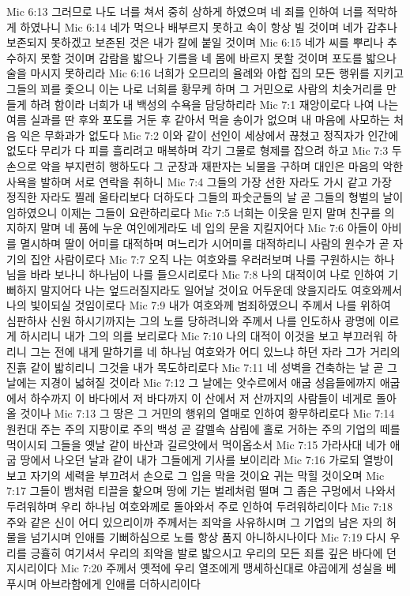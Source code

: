 Mic 6:13  그러므로 나도 너를 쳐서 중히 상하게 하였으며 네 죄를 인하여 너를 적막하게 하였나니
Mic 6:14  네가 먹으나 배부르지 못하고 속이 항상 빌 것이며 네가 감추나 보존되지 못하겠고 보존된 것은 내가 칼에 붙일 것이며
Mic 6:15  네가 씨를 뿌리나 추수하지 못할 것이며 감람을 밟으나 기름을 네 몸에 바르지 못할 것이며 포도를 밟으나 술을 마시지 못하리라
Mic 6:16  너희가 오므리의 율례와 아합 집의 모든 행위를 지키고 그들의 꾀를 좇으니 이는 나로 너희를 황무케 하며 그 거민으로 사람의 치솟거리를 만들게 하려 함이라 너희가 내 백성의 수욕을 담당하리라
Mic 7:1  재앙이로다 나여 나는 여름 실과를 딴 후와 포도를 거둔 후 같아서 먹을 송이가 없으며 내 마음에 사모하는 처음 익은 무화과가 없도다
Mic 7:2  이와 같이 선인이 세상에서 끊쳤고 정직자가 인간에 없도다 무리가 다 피를 흘리려고 매복하며 각기 그물로 형제를 잡으려 하고
Mic 7:3  두 손으로 악을 부지런히 행하도다 그 군장과 재판자는 뇌물을 구하며 대인은 마음의 악한 사욕을 발하며 서로 연락을 취하니
Mic 7:4  그들의 가장 선한 자라도 가시 같고 가장 정직한 자라도 찔레 울타리보다 더하도다 그들의 파숫군들의 날 곧 그들의 형벌의 날이 임하였으니 이제는 그들이 요란하리로다
Mic 7:5  너희는 이웃을 믿지 말며 친구를 의지하지 말며 네 품에 누운 여인에게라도 네 입의 문을 지킬지어다
Mic 7:6  아들이 아비를 멸시하며 딸이 어미를 대적하며 며느리가 시어미를 대적하리니 사람의 원수가 곧 자기의 집안 사람이로다
Mic 7:7  오직 나는 여호와를 우러러보며 나를 구원하시는 하나님을 바라 보나니 하나님이 나를 들으시리로다
Mic 7:8  나의 대적이여 나로 인하여 기뻐하지 말지어다 나는 엎드러질지라도 일어날 것이요 어두운데 앉을지라도 여호와께서 나의 빛이되실 것임이로다
Mic 7:9  내가 여호와께 범죄하였으니 주께서 나를 위하여 심판하사 신원 하시기까지는 그의 노를 당하려니와 주께서 나를 인도하사 광명에 이르게 하시리니 내가 그의 의를 보리로다
Mic 7:10  나의 대적이 이것을 보고 부끄러워 하리니 그는 전에 내게 말하기를 네 하나님 여호와가 어디 있느냐 하던 자라 그가 거리의 진흙 같이 밟히리니 그것을 내가 목도하리로다
Mic 7:11  네 성벽을 건축하는 날 곧 그 날에는 지경이 넓혀질 것이라
Mic 7:12  그 날에는 앗수르에서 애굽 성읍들에까지 애굽에서 하수까지 이 바다에서 저 바다까지 이 산에서 저 산까지의 사람들이 네게로 돌아올 것이나
Mic 7:13  그 땅은 그 거민의 행위의 열매로 인하여 황무하리로다
Mic 7:14  원컨대 주는 주의 지팡이로 주의 백성 곧 갈멜속 삼림에 홀로 거하는 주의 기업의 떼를 먹이시되 그들을 옛날 같이 바산과 길르앗에서 먹이옵소서
Mic 7:15  가라사대 네가 애굽 땅에서 나오던 날과 같이 내가 그들에게 기사를 보이리라
Mic 7:16  가로되 열방이 보고 자기의 세력을 부끄려서 손으로 그 입을 막을 것이요 귀는 막힐 것이오며
Mic 7:17  그들이 뱀처럼 티끌을 핥으며 땅에 기는 벌레처럼 떨며 그 좁은 구멍에서 나와서 두려워하며 우리 하나님 여호와께로 돌아와서 주로 인하여 두려워하리이다
Mic 7:18  주와 같은 신이 어디 있으리이까 주께서는 죄악을 사유하시며 그 기업의 남은 자의 허물을 넘기시며 인애를 기뻐하심으로 노를 항상 품지 아니하시나이다
Mic 7:19  다시 우리를 긍휼히 여기셔서 우리의 죄악을 발로 밟으시고 우리의 모든 죄를 깊은 바다에 던지시리이다
Mic 7:20  주께서 옛적에 우리 열조에게 맹세하신대로 야곱에게 성실을 베푸시며 아브라함에게 인애를 더하시리이다



